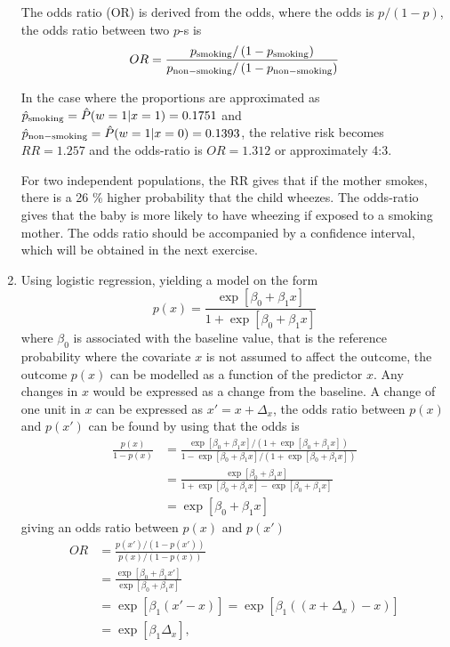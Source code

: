 \documentclass[a4paper,11pt]{article}
\begin{document}
\begin{enumerate}[label=3\alph*)]
        The odds ratio (OR) is derived from the odds, where the odds is $p/(1-p)$, the odds ratio between two $p$-s is
        \begin{equation}
            OR = \frac{p_{\rm smoking} / \left( 1-p_{\rm smoking} \right)}{p_{\rm non-smoking} / \left( 1-p_{\rm non-smoking} \right)}
            \label{eq:OR}
        \end{equation}

        In the case where the proportions are approximated as $\hat{p}_{\rm smoking} = \hat{P}(w=1 | x=1 ) = 0.1751$ and $\hat{p}_{\rm non-smoking} = \hat{P}(w=1 | x=0) = 0.1393$, the relative risk becomes $RR = 1.257$ and the odds-ratio is $OR = 1.312$ or approximately 4:3. 

        For two independent populations, the RR gives that if the mother smokes, there is a 26 \% higher probability that the child wheezes. The odds-ratio gives that the baby is more likely to have wheezing if exposed to a smoking mother. The odds ratio should be accompanied by a confidence interval, which will be obtained in the next exercise. 

    \item Using logistic regression, yielding a model on the form
        \begin{equation}
            p(x) = \frac{\exp\left[ \beta_0 + \beta_1 x \right]}{1 + \exp\left[ \beta_0 + \beta_1 x \right]}
            \label{eq:logit}
        \end{equation}
        where $\beta_0$ is associated with the baseline value, that is the reference probability where the covariate $x$ is not assumed to affect the outcome, the outcome $p(x)$ can be modelled as a function of the predictor $x$. Any changes in $x$ would be expressed as a change from the baseline. A change of one unit in $x$ can be expressed as $x' = x + \Delta_x$, the odds ratio between $p(x)$ and $p(x')$ can be found by using that the odds is 
        \begin{align*}
            \frac{p(x)}{1 - p(x)} &= \frac{\exp\left[ \beta_0 + \beta_1 x \right] / \left( 1 + \exp\left[ \beta_0 + \beta_1 x \right] \right)}{1 - \exp\left[ \beta_0 + \beta_1 x \right]/\left( 1 + \exp\left[ \beta_0 + \beta_1 x \right] \right)} \\
            &= \frac{\exp\left[ \beta_0 + \beta_1 x \right]}{1 + \exp\left[ \beta_0 + \beta_1 x \right] - \exp\left[ \beta_0 + \beta_1 x \right]} \\
            &= \exp\left[ \beta_0 + \beta_1 x \right]
        \end{align*}
        giving an odds ratio between $p(x)$ and $p(x')$
        \begin{align*}
            OR &= \frac{p(x')/\left( 1 - p(x') \right)}{p(x)/\left( 1-p(x) \right)} \\
            &= \frac{\exp\left[ \beta_0 + \beta_1 x' \right]}{\exp\left[ \beta_0 + \beta_1 x \right]} \\
            &= \exp\left[ \beta_1 \left( x' - x \right) \right] = \exp\left[ \beta_1 \left( (x + \Delta_x) - x \right) \right] \\
            &= \exp\left[ \beta_1 \Delta_x \right],
        \end{align*}


\end{enumerate}
\end{document}
